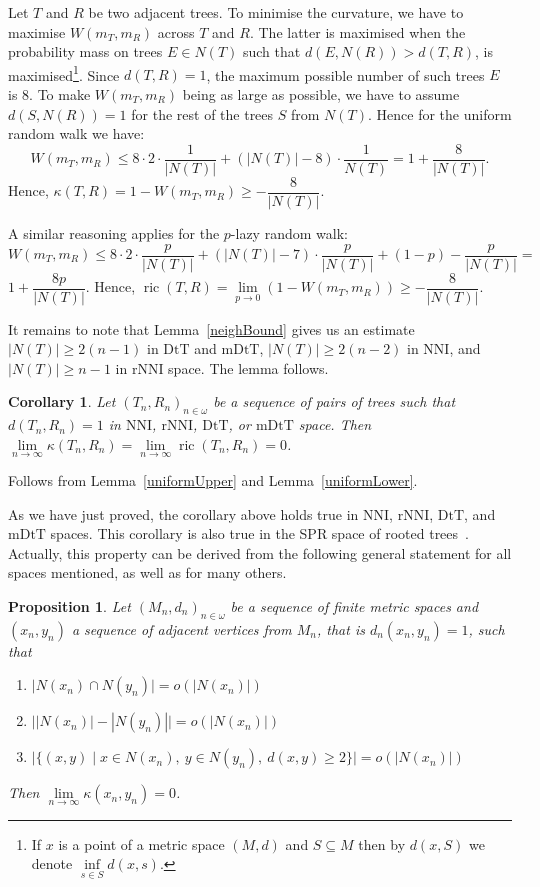 \documentclass{amsart}
\newtheorem{proposition}[lemma]{Proposition}
\newtheorem{corollary}[lemma]{Corollary}
\newcommand{\dts}{\mathrm{DtT}}
\newcommand{\nni}{\mathrm{NNI}}
\newcommand{\rnni}{\mathrm{rNNI}}
\newcommand{\mdts}{\mathrm{mDtT}}
\newcommand{\ric}{\operatorname{ric}}
\begin{document}
\proof
Let $T$ and $R$ be two adjacent trees. To minimise the curvature, we have
to maximise $W(m_T, m_R)$ across $T$ and $R$. The latter is maximised when the probability mass
on trees $E\in N(T)$ such that $d(E, N(R)) > d(T, R)$, is
maximised\footnote{If $x$ is a point of a metric space $(M,d)$ and
$S \subseteq M$ then by $d(x,S)$ we denote $\inf\limits_{s \in S} d(x,s)$.}.
Since $d(T, R) = 1$, the maximum possible number of such trees $E$ is
$8$. To make $W(m_T,m_R)$ being as large as possible, we have to assume
$d(S, N(R)) = 1$ for the rest of the trees $S$ from $N(T)$.
Hence for the uniform random walk we have:
\[
W(m_T,m_R)\leq 8 \cdot 2 \cdot \frac{1}{|N(T)|} +
(|N(T)| - 8) \cdot \frac{1}{N(T)} = 1 + \dfrac{8}{|N(T)|}.
\]
Hence, $\kappa(T,R) = 1 - W(m_T,m_R) \geq - \dfrac{8}{|N(T)|}$.

A similar reasoning applies for the $p$-lazy random walk:
\[
W(m_T,m_R)\leq 8 \cdot 2 \cdot \frac{p}{|N(T)|} +
(|N(T)| - 7) \cdot \frac{p}{|N(T)|} + (1-p) - \frac{p}{|N(T)|} =
\]
$1 + \dfrac{8p}{|N(T)|}$. Hence,
$\ric(T,R) = \lim\limits_{p\to0}\left(1 - W(m_T,m_R)\right) \geq - \dfrac{8}{|N(T)|}$.

It remains to note that Lemma~\ref{neighBound} gives us an estimate $|N(T)| \geq 2(n-1)$ in $\dts$ and $\mdts$, $|N(T)| \geq 2(n-2)$ in $\nni$, and $|N(T)| \geq n-1$ in $\rnni$ space.
The lemma follows.
\endproof

\begin{corollary}\label{flatInLimDTS}
Let $(T_n,R_n)_{n\in\omega}$ be a sequence of pairs of trees such that
$d(T_n,R_n) = 1$ in $\nni$, $\rnni$, $\dts$, or $\mdts$ space.
Then $\lim\limits_{n \to \infty}\kappa(T_n,R_n) = \lim\limits_{n \to \infty}\ric(T_n,R_n) = 0$.
\end{corollary}

\proof
Follows from Lemma~\ref{uniformUpper} and Lemma~\ref{uniformLower}.
\endproof

As we have just proved, the corollary above holds true in $\nni$, $\rnni$, $\dts$, and $\mdts$ spaces.
This corollary is also true in the SPR space of rooted trees~\cite{Whidden2015-es}.
Actually, this property can be derived from the following general statement for all spaces mentioned, as well as for many others.

\begin{proposition}\label{flatInLimGen}
Let $(M_n,d_n)_{n \in \omega}$ be a sequence of finite metric spaces and
$(x_n, y_n)$ a sequence of adjacent vertices from $M_n$,
that is $d_n(x_n,y_n) = 1$, such that
\begin{enumerate}[(1)]
\item\label{intersec} $\big|N(x_n) \cap N(y_n)\big| = o(|N(x_n)|)$
\item\label{difference} $\big||N(x_n)| - |N(y_n)|\big| = o(|N(x_n)|)$
\item\label{dist2} $\big|\{(x,y) \mid
	x \in N(x_n),~ y \in N(y_n),~ d(x, y) \geq 2\}\big| = o(|N(x_n)|)$
\end{enumerate}

Then $\lim\limits_{n \to \infty} \kappa(x_n, y_n) = 0$.
\end{proposition}
\end{document}
